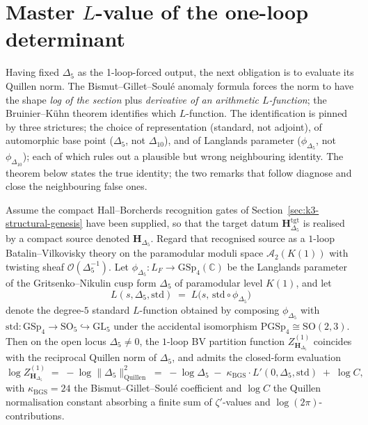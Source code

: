 \section{Master \texorpdfstring{$L$}{L}-value of the one-loop determinant}
\label{sec:k3-master-L-value}

Having fixed $\Delta_5$ as the 1-loop-forced output, the next obligation is to
evaluate its Quillen norm. The Bismut--Gillet--Soul\'e anomaly formula forces
the norm to have the shape \emph{log of the section} plus \emph{derivative of an
arithmetic $L$-function}; the Bruinier--K\"uhn theorem identifies which
$L$-function. The identification is pinned by three strictures; the choice
of representation (standard, not adjoint), of automorphic base point
($\Delta_5$, not $\Delta_{10}$), and of Langlands parameter ($\phi_{\Delta_5}$,
not $\phi_{\Delta_{10}}$); each of which rules out a plausible but wrong
neighbouring identity. The theorem below states the true identity; the two
remarks that follow diagnose and close the neighbouring false ones.

\begin{theorem}
\label{thm:k3-master-L-value}
Assume the compact Hall--Borcherds recognition gates of
Section~\ref{sec:k3-structural-genesis} have been supplied, so that the
target datum $\mathbf{H}_{\Delta_5}^{\mathrm{tgt}}$ is realised by a
compact source denoted $\mathbf{H}_{\Delta_5}$. Regard that recognised
source as a $1$-loop Batalin--Vilkovisky theory on the paramodular moduli
space $\mathcal{A}_2(K(1))$ with twisting sheaf
$\mathcal{O}(\Delta_5^{-1})$. Let
$\phi_{\Delta_5}\colon L_F \to \mathrm{GSp}_4(\mathbb{C})$ be the Langlands
parameter of the Gritsenko--Nikulin cusp form $\Delta_5$ of paramodular level
$K(1)$, and let
\[
 L(s,\Delta_5,\mathrm{std})
 \;=\;
 L\bigl(s,\,\mathrm{std}\circ \phi_{\Delta_5}\bigr)
\]
denote the degree-$5$ standard $L$-function obtained by composing
$\phi_{\Delta_5}$ with $\mathrm{std}\colon \mathrm{GSp}_4 \to
\mathrm{SO}_5 \hookrightarrow \mathrm{GL}_5$ under the accidental isomorphism
$\mathrm{PGSp}_4 \cong \mathrm{SO}(2,3)$. Then on the open locus
$\Delta_5 \neq 0$, the $1$-loop BV partition function
$Z^{(1)}_{\mathbf{H}_{\Delta_5}}$ coincides with the reciprocal Quillen norm of
$\Delta_5$, and admits the closed-form evaluation
\[
 \log Z^{(1)}_{\mathbf{H}_{\Delta_5}}
 \;=\;
 -\log\|\Delta_5\|^2_{\mathrm{Quillen}}
 \;=\;
 -\log\Delta_5 \;-\; \kappa_{\mathrm{BGS}}\cdot L'(0,\Delta_5,\mathrm{std})
 \;+\; \log C,
\]
with $\kappa_{\mathrm{BGS}} = 24$ the Bismut--Gillet--Soul\'e coefficient and
$\log C$ the Quillen normalisation constant absorbing a finite sum of
$\zeta'$-values and $\log(2\pi)$-contributions.
\end{theorem}

